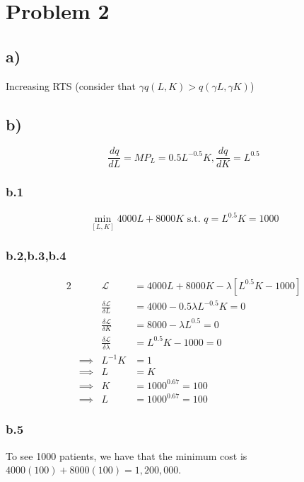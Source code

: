 \documentclass[12pt,letterpaper]{article}
\theoremstyle{definition}
\newcommand{\Lag}{\mathcal{L}}
\begin{document}
\section*{Problem 2}

\subsection*{a)}

Increasing RTS (consider that $\gamma q(L,K) > q(\gamma L, \gamma K)$)

\subsection*{b)}

\[
  \frac{dq}{dL} = MP_L = 0.5L^{-0.5}K, \frac{dq}{dK} = L^{0.5}
\]

\subsubsection*{b.1}

\[
  \min_{[L,K]} 4000L + 8000K \text{ s.t. } q = L^{0.5}K = 1000
\]

\subsubsection*{b.2,b.3,b.4}

\begin{alignat*}{2}
  && \Lag &= 4000L + 8000K - \lambda[L^{0.5}K - 1000] \\
  && \frac{\delta \Lag}{\delta L} &= 4000 - 0.5\lambda L^{-0.5}K = 0 \\
  && \frac{\delta \Lag}{\delta K} &= 8000 - \lambda L^{0.5} =0 \\
  && \frac{\delta \Lag}{\delta \lambda} &=L^{0.5}K  - 1000 = 0\\
  &\implies& L^{-1}K &= 1 \\
  &\implies& L &= K \\
  &\implies& K &= 1000^{0.67} = 100 \\
  &\implies& L &= 1000^{0.67} = 100
\end{alignat*}

\subsubsection*{b.5}

To see 1000 patients, we have that the minimum cost is $4000(100) + 8000(100) = 1,200,000$.
\end{document}
